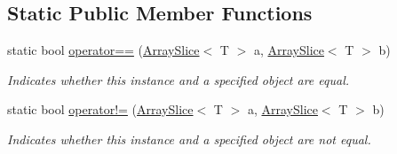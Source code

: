 \subsection*{Static Public Member Functions}
\begin{DoxyCompactItemize}
\item 
static bool \hyperlink{struct_shared_memory_1_1_utilities_1_1_array_slice_a1c49d74991d38b31298164a430abfb0e}{operator==} (\hyperlink{struct_shared_memory_1_1_utilities_1_1_array_slice}{Array\+Slice}$<$ T $>$ a, \hyperlink{struct_shared_memory_1_1_utilities_1_1_array_slice}{Array\+Slice}$<$ T $>$ b)
\begin{DoxyCompactList}\small\item\em Indicates whether this instance and a specified object are equal.\end{DoxyCompactList}\item 
static bool \hyperlink{struct_shared_memory_1_1_utilities_1_1_array_slice_a5f8a8fdd67750a99ceaf1cd713083f41}{operator!=} (\hyperlink{struct_shared_memory_1_1_utilities_1_1_array_slice}{Array\+Slice}$<$ T $>$ a, \hyperlink{struct_shared_memory_1_1_utilities_1_1_array_slice}{Array\+Slice}$<$ T $>$ b)
\begin{DoxyCompactList}\small\item\em Indicates whether this instance and a specified object are not equal.\end{DoxyCompactList}\end{DoxyCompactItemize}

